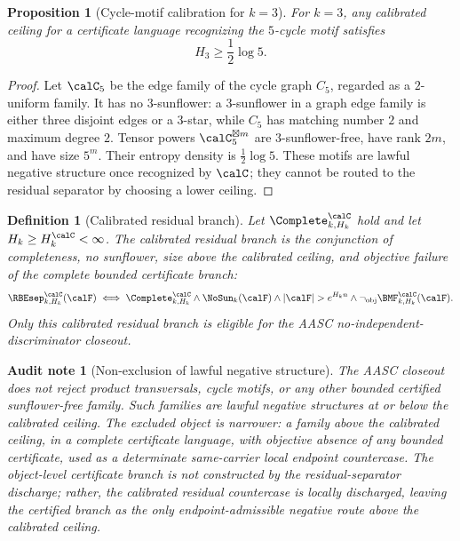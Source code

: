 \documentclass[11pt]{article}
\newtheorem{proposition}[theorem]{Proposition}
\newtheorem{definition}[theorem]{Definition}
\newtheorem{audit}[theorem]{Audit note}
\begin{document}
\begin{proposition}[Cycle-motif calibration for \(k=3\)]
For \(k=3\), any calibrated ceiling for a certificate language recognizing the \(5\)-cycle motif satisfies
\[
  H_3\ge \frac12\log 5.
\]
\end{proposition}

\begin{proof}
Let \(\calC_5\) be the edge family of the cycle graph \(C_5\), regarded as a \(2\)-uniform family.  It has no \(3\)-sunflower: a \(3\)-sunflower in a graph edge family is either three disjoint edges or a \(3\)-star, while \(C_5\) has matching number \(2\) and maximum degree \(2\).  Tensor powers \(\calC_5^{\boxtimes m}\) are \(3\)-sunflower-free, have rank \(2m\), and have size \(5^m\).  Their entropy density is \(\frac12\log 5\).  These motifs are lawful negative structure once recognized by \(\calC\); they cannot be routed to the residual separator by choosing a lower ceiling.
\end{proof}

\begin{definition}[Calibrated residual branch]
Let \(\Complete^{\calC}_{k,H_k}\) hold and let \(H_k\ge H_k^{\calC}<\infty\).  The calibrated residual branch is the conjunction of completeness, no sunflower, size above the calibrated ceiling, and objective failure of the complete bounded certificate branch:
\[
  \RBEsep^{\calC}_{k,H_k}(\calF)
  \iff
  \Complete^{\calC}_{k,H_k}
  \wedge
  \NoSun_k(\calF)
  \wedge
  |\calF|>e^{H_k n}
  \wedge
  \neg_{\mathrm{obj}}\BMF^{\calC}_{k,H_k}(\calF).
\]
Only this calibrated residual branch is eligible for the AASC no-independent-discriminator closeout.
\end{definition}

\begin{audit}[Non-exclusion of lawful negative structure]
The AASC closeout does not reject product transversals, cycle motifs, or any other bounded certified sunflower-free family.  Such families are lawful negative structures at or below the calibrated ceiling.  The excluded object is narrower: a family above the calibrated ceiling, in a complete certificate language, with objective absence of any bounded certificate, used as a determinate same-carrier local endpoint countercase.  The object-level certificate branch is not constructed by the residual-separator discharge; rather, the calibrated residual countercase is locally discharged, leaving the certified branch as the only endpoint-admissible negative route above the calibrated ceiling.
\end{audit}
\end{document}
